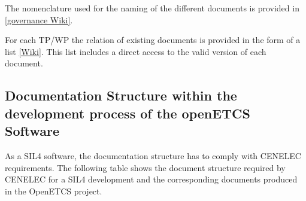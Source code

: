 \documentclass{template/openetcs_article}
\begin{document}
The nomenclature used for the naming of the different documents is provided in \href{https://github.com/openETCS/governance/wiki/Nomenclature-Guideline}{[governance Wiki]}.

For each TP/WP the relation of existing documents is provided in the form of a list \href{https://github.com/openETCS/governance/wiki}{[Wiki]}. This list includes a direct access to the valid version of each document.

\subsection{Documentation Structure within the development process of the openETCS Software}
As a SIL4 software, the documentation structure has to comply with CENELEC requirements. The following table shows the document structure required by CENELEC for a SIL4 development and the corresponding documents produced in the OpenETCS project.
\end{document}
